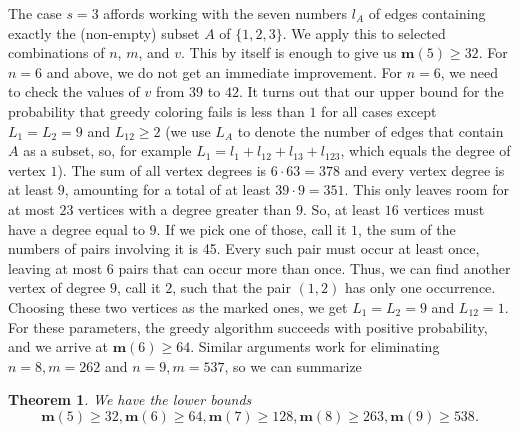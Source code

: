 \documentclass[a4paper,12pt]{article}
\newtheorem{theorem}{Theorem}
\begin{document}
The case $s=3$ affords working with the seven numbers $l_A$ of edges
containing exactly the (non-empty) subset  $A$ of $\{1,2,3\}$. We apply this 
 to selected combinations of $n$, $m$, and $v$. This by itself is enough
to give us $\mathbf m(5)\ge 32$. For $n=6$ and above, we do not get an immediate
improvement. For $n=6$, we need to check the values of $v$ from  $39$ 
to $42$. It turns out that our upper bound for the probability that 
greedy coloring fails is less than $1$ for all cases except $L_1=L_2=9$
and $L_{12}\ge 2$ (we use
$L_A$ to denote the number of edges that contain $A$ as a subset, so,
for example $L_1=l_1+l_{12}+l_{13}+l_{123}$, which equals the degree of vertex
$1$). 
The sum of all vertex degrees is $6\cdot 63=378$ and
every vertex degree is at least $9$, amounting for a total of at least
$39\cdot 9=351$. This only leaves
 room for at most $23$ vertices with a degree greater than 
$9$. So, at least $16$ vertices must have a degree equal to $9$. If we pick one
of those, call it $1$, the sum of the numbers of pairs involving it is 45. 
Every such pair must occur at least once, leaving at most $6$ pairs that 
can occur more than once. Thus,
 we can find another vertex of degree $9$, call it
$2$, such that the pair $(1,2)$ has only one occurrence. Choosing these two 
vertices as the marked ones, we get $L_1=L_2=9$ and $L_{12}=1$. For these
parameters, the greedy algorithm succeeds with positive probability, and
we arrive at $\mathbf m(6)\ge 64$. Similar
arguments work for eliminating $n=8, m=262$ and $n=9,m=537$, so we can 
summarize
\begin{theorem}
We have the lower bounds
\[\mathbf m(5)\ge 32, \mathbf m(6)\ge 64, \mathbf m(7)\ge 128, \mathbf m(8)\ge 263, \mathbf m(9)\ge 538.\]
\end{theorem}
\end{document}
